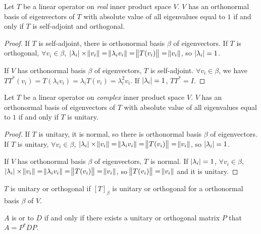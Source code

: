 \begin{theorem}
    Let $T$ be a linear operator on \emph{real} inner product space $V$. $V$ has an orthonormal basis of eigenvectors of $T$ with absolute value of all eigenvalues equal to $1$ if and only if $T$ is self-adjoint and orthogonal.    
\end{theorem}
\begin{proof}
    If $T$ is self-adjoint, there is orthonormal basis $\beta$ of eigenvectors. If $T$ is orthogonal, $\forall v_i \in \beta$, $\displaystyle \left\lvert \lambda_i \right\rvert \times \norm{v_i} = \norm{\lambda_i v_i} = \norm{T(v_i)} = \norm{v_i}$, so $\displaystyle \left\lvert \lambda_i \right\rvert = 1$.
    
    If $V$ has orthonormal basis $\beta$ of eigenvectors, $T$ is self-adjoint. $\forall v_i \in \beta$, we have $TT^* (v_i) = T(\lambda_i v_i ) = \lambda_i T(v_i) = \lambda_i^2 v_i$. If $\displaystyle \left\lvert \lambda_i \right\rvert = 1$, $TT^* = I$.
\end{proof}

\begin{theorem}
    Let $T$ be a linear operator on \emph{complex} inner product space $V$. $V$ has an orthonormal basis of eigenvectors of $T$ with absolute value of all eigenvalues equal to  $1$ if and only if $T$ is unitary.
\end{theorem}
\begin{proof}
    If $T$ is unitary, it is normal, so there is orthonormal basis $\beta$ of eigenvectors. If $T$ is unitary, $\forall v_i \in \beta$, $\displaystyle \left\lvert \lambda_i \right\rvert \times \norm{v_i} = \norm{\lambda_i v_i} = \norm{T(v_i)} = \norm{v_i}$, so $\displaystyle \left\lvert \lambda_i \right\rvert = 1$.
    
    If $V$ has orthonormal basis $\beta$ of eigenvectors, $T$ is normal. If $\displaystyle \left\lvert \lambda_i \right\rvert = 1$, $\forall v_i \in \beta$, $\displaystyle \left\lvert \lambda_i \right\rvert \times \norm{v_i} = \norm{\lambda_i v_i} = \norm{T(v_i)} = \norm{v_i}$, so $\norm{T(v_i)} = \norm{v_i}$ and it is unitary.
\end{proof}

\begin{theorem}
    $T$ is unitary or orthogonal if $[T]_\beta$ is unitary or orthogonal for a orthonormal basis $\beta$ of $V$.
\end{theorem}

\begin{definition}
    $A$ is  or  to $D$ if and only if there exists a unitary or orthogonal matrix $P$ that $A = P^* D P$.
\end{definition}

